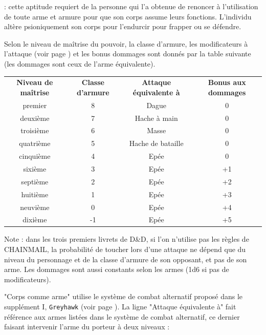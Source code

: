 \documentclass[11pt]{article}
\newcommand{\uline}[1]{\underline{\smash{#1}\vphantom{T}}\vphantom{#1}}
\begin{document}
{\bigskip

\label{guerrier-corps-comme-arme}\textbf{\uline{Corps comme arme (0)}} : cette aptitude requiert de la personne qui l'a obtenue de renoncer à l'utilisation de toute arme et armure pour que son corps assume leurs fonctions. L'individu altère psioniquement son corps pour l'endurcir pour frapper ou se défendre.

\bigskip

Selon le niveau de maîtrise du pouvoir, la classe d'armure, les modificateurs à l'attaque (voir page \pageref{custom-combat-alternatif}) et les bonus dommages sont donnés par la table suivante (les dommages sont ceux de l'arme équivalente).

\bigskip

\begin{tabular}{cccc}
\textbf{Niveau de maîtrise} & \textbf{Classe d'armure} & \textbf{Attaque équivalente à} & \textbf{Bonus aux dommages}\\
premier     & 8  & Dague                & 0 \\
deuxième    & 7  & Hache à main         & 0 \\
troisième   & 6  & Masse                & 0 \\
quatrième   & 5  & Hache de bataille    & 0 \\
cinquième   & 4  & Epée                 & 0 \\
sixième     & 3  & Epée                 & +1 \\
septième    & 2  & Epée                 & +2 \\
huitième    & 1  & Epée                 & +3 \\
neuvième    & 0  & Epée                 & +4 \\
dixième     & -1 & Epée                 & +5 \\
\end{tabular}

\bigskip

Note : dans les trois premiers livrets de D\&D, si l'on n'utilise pas les règles de CHAINMAIL, la probabilité de toucher lors d'une attaque ne dépend que du niveau du personnage et de la classe d'armure de son opposant, et pas de son arme. Les dommages sont aussi constants selon les armes (1d6 si pas de modificateurs).

\bigskip

"Corps comme arme" utilise le système de combat alternatif proposé dans le supplément I, \texttt{Greyhawk} (voir page \pageref{custom-combat-alternatif}). La ligne "Attaque équivalente à" fait référence aux armes listées dans le système de combat alternatif, ce dernier faisant intervenir l'arme du porteur à deux niveaux :

}
\end{document}
